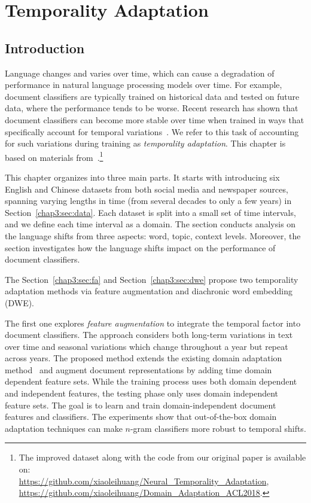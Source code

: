 \chapter{Temporality Adaptation}
\label{chp:temporality}

\section{Introduction}
Language changes and varies over time,
which can cause a degradation of performance in
natural language processing models over time.
For example, document classifiers are typically trained on historical data and tested on future data, where the performance tends to be worse.
Recent research has shown that document classifiers can become more stable over time when trained in ways that specifically account for temporal variations~\cite{he2018time}.
We refer to this task of accounting for such variations during training as {\em temporality adaptation}.
This chapter is based on materials from~\cite{huang2018examining, huang2019neural}.\footnote{The improved dataset along with the code from our original paper is available on: \\\url{https://github.com/xiaoleihuang/Neural_Temporality_Adaptation}, \\\url{https://github.com/xiaoleihuang/Domain_Adaptation_ACL2018}.}

This chapter organizes into three main parts.
It starts with introducing six English and Chinese datasets from both social media and newspaper sources, spanning varying lengths in time (from several decades to only a few years) in Section~\ref{chap3:sec:data}. 
Each dataset is split into a small set of time intervals, and we define each time interval as a domain. 
The section conducts analysis on the language shifts from three aspects: word, topic, context levels. 
Moreover, the section investigates how the language shifts impact on the performance of document classifiers.

The Section~\ref{chap3:sec:fa} and Section~\ref{chap3:sec:dwe} propose two temporality adaptation methods via feature augmentation and diachronic word embedding (DWE).

The first one explores \textit{feature augmentation} to integrate the temporal factor into document classifiers.
The approach considers both long-term variations in text over time and seasonal variations which change throughout a year but repeat across years.
The proposed method extends the existing domain adaptation method~\cite{daume2007frustratingly} and augment document representations by adding time domain dependent feature sets.
While the training process uses both domain dependent and independent features, the testing phase only uses domain independent feature sets.
The goal is to learn and train domain-independent document features and classifiers.
The experiments show that out-of-the-box domain adaptation techniques can make $n$-gram classifiers more robust to temporal shifts.

